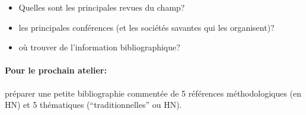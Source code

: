 \documentclass[a4paper,twoside,12pt]{book}
\begin{document}
\begin{itemize}
	\item Quelles sont les principales revues du champ?
	\item les principales conférences (et les sociétés savantes qui les organisent)?
	\item où trouver de l'information bibliographique?
\end{itemize}

\paragraph{Pour le prochain atelier:}
préparer une petite bibliographie commentée de 5 références méthodologiques (en HN) et 5 thématiques (``traditionnelles'' ou HN).


\backmatter

\listoffigures
\tableofcontents
\end{document}
